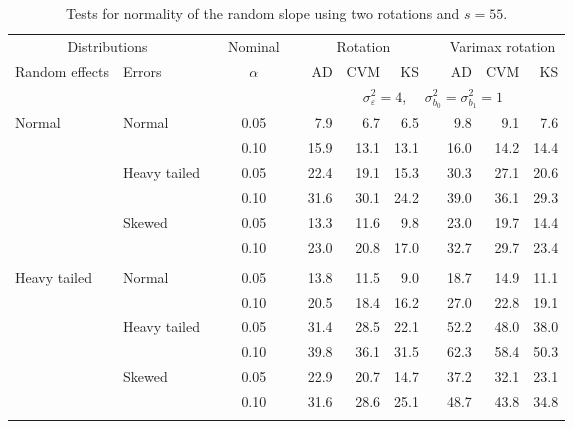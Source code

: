 \begin{table}[ht]
\caption{\label{tab:simb1s55-alt}Tests for normality of the random slope using two rotations and $s = 55$.}
\begin{scriptsize}
\begin{center}
\begin{tabular}{ll p{.1cm} c p{.1cm} rrr p{.1cm} rrr}
  \hline
  \multicolumn{2}{c}{Distributions}& & Nominal & &  \multicolumn{3}{c}{Rotation} & & \multicolumn{3}{c}{Varimax rotation} \\ \cline{1-2} \cline{6-8} \cline{10-12}   
  Random effects & Errors & & $\alpha$ & & AD & CVM & KS & & AD & CVM & KS \\ 
   \hline
& && && \multicolumn{7}{c}{$\sigma_{\varepsilon}^2 = 4$, \ \ $\sigma_{b_0}^2 = \sigma_{b_1}^2 = 1$} \\ \cline{6-12}
\rowcolor{gray!20}Normal       & Normal       && 0.05 &&   7.9 & 6.7 & 6.5 &   & 9.8 & 9.1 & 7.6 \\ 
\rowcolor{gray!20}             &              && 0.10 &&   15.9 & 13.1 & 13.1 &   & 16.0 & 14.2 & 14.4 \\ 
\rowcolor{gray!20}             & Heavy tailed && 0.05 &&   22.4 & 19.1 & 15.3 &   & 30.3 & 27.1 & 20.6 \\ 
\rowcolor{gray!20}             &              && 0.10 &&   31.6 & 30.1 & 24.2 &   & 39.0 & 36.1 & 29.3 \\ 
\rowcolor{gray!20}             & Skewed       && 0.05 &&   13.3 & 11.6 & 9.8 &   & 23.0 & 19.7 & 14.4 \\ 
\rowcolor{gray!20}             &              && 0.10 &&   23.0 & 20.8 & 17.0 &   & 32.7 & 29.7 & 23.4 \\ 
&&&&&&&&&&&\\
Heavy tailed & Normal       && 0.05 &&   13.8 & 11.5 & 9.0 &   & 18.7 & 14.9 & 11.1 \\ 
             &              && 0.10 &&   20.5 & 18.4 & 16.2 &   & 27.0 & 22.8 & 19.1 \\ 
             & Heavy tailed && 0.05 &&   31.4 & 28.5 & 22.1 &   & 52.2 & 48.0 & 38.0 \\ 
             &              && 0.10 &&   39.8 & 36.1 & 31.5 &   & 62.3 & 58.4 & 50.3 \\ 
             & Skewed       && 0.05 &&   22.9 & 20.7 & 14.7 &   & 37.2 & 32.1 & 23.1 \\ 
             &              && 0.10 &&   31.6 & 28.6 & 25.1 &   & 48.7 & 43.8 & 34.8 \\ 
&&&&&&&&&&&\\

\end{tabular}
\end{center}
\end{scriptsize}
\end{table}
